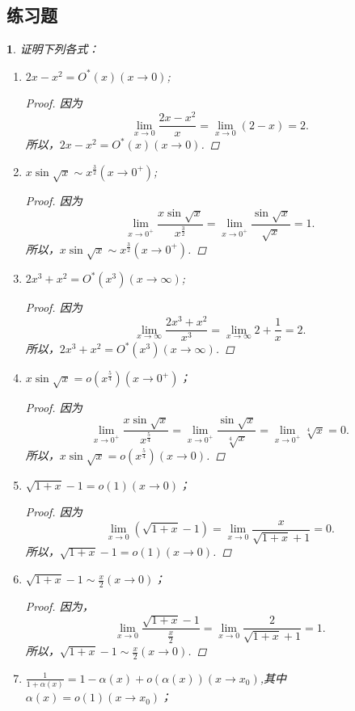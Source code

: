 \documentclass[utf8]{book}
\newtheorem{example}{}[section]             %
\begin{document}
\subsection{练习题}
\begin{example}证明下列各式：
\renewcommand\labelenumi{\normalfont(\theenumi)}
\begin{enumerate}
\item $2x-x^2=O^*(x)(x\to 0)$;
\begin{proof}因为
$$\displaystyle\lim_{x\to 0}\frac{2x-x^2}{x} = \displaystyle\lim_{x\to 0}(2-x)=2.$$
所以，$2x-x^2=O^*(x)(x\to 0)$.
\end{proof}
\item $x\sin{\sqrt{x}}\sim x^{\frac{3}{2}}(x\to 0^+)$;
\begin{proof}因为
$$\displaystyle\lim_{x\to 0^+}\frac{x\sin{\sqrt{x}}}{x^{\frac{3}{2}}} =\displaystyle\lim_{x\to 0^+}\frac{\sin{\sqrt{x}}}{\sqrt{x}}=1.$$
所以，$x\sin{\sqrt{x}}\sim x^{\frac{3}{2}}(x\to 0^+)$.
\end{proof}
\item $2x^3+x^2=O^*(x^3)(x\to \infty)$;
\begin{proof}因为
$$\displaystyle\lim_{x\to \infty}\frac{2x^3+x^2}{x^3} =\displaystyle\lim_{x\to \infty}2+\frac{1}{x} = 2.$$
所以，$2x^3+x^2=O^*(x^3)(x\to \infty)$.
\end{proof}
\item $x\sin{\sqrt{x}}=o(x^{\frac{5}{4}})(x\to 0^+)$；
\begin{proof}因为
$$\displaystyle\lim_{x\to 0^+}\frac{x\sin{\sqrt{x}}}{x^{\frac{5}{4}}} =\displaystyle\lim_{x\to 0^+}\frac{\sin{\sqrt{x}}}{\sqrt[4]{x}}=\displaystyle\lim_{x\to 0^+}\sqrt[4]{x}=0.$$
所以，$x\sin{\sqrt{x}}=o(x^{\frac{5}{4}})(x\to 0)$.
\end{proof}
\item $\sqrt{1+x}-1=o(1)(x\to 0)$；
\begin{proof}因为
$$\displaystyle\lim_{x\to 0}(\sqrt{1+x}-1)=\displaystyle\lim_{x\to 0}\frac{x}{\sqrt{1+x}+1}=0.$$
所以，$\sqrt{1+x}-1=o(1)(x\to 0)$.
\end{proof}
\item $\sqrt{1+x}-1\sim \frac{x}{2}(x\to 0)$；
\begin{proof}因为，
$$\displaystyle\lim_{x\to 0}\frac{\sqrt{1+x}-1}{\frac{x}{2}}=\displaystyle\lim_{x\to 0}\frac{2}{\sqrt{1+x}+1}=1.$$
所以，$\sqrt{1+x}-1\sim \frac{x}{2}(x\to 0)$.
\end{proof}
\item $\displaystyle\frac{1}{1+\alpha(x)}=1-\alpha(x)+o(\alpha(x))(x\to x_0)$,其中$\alpha(x)=o(1)(x\to x_0)$；

\end{enumerate}
\end{example}
\end{document}
